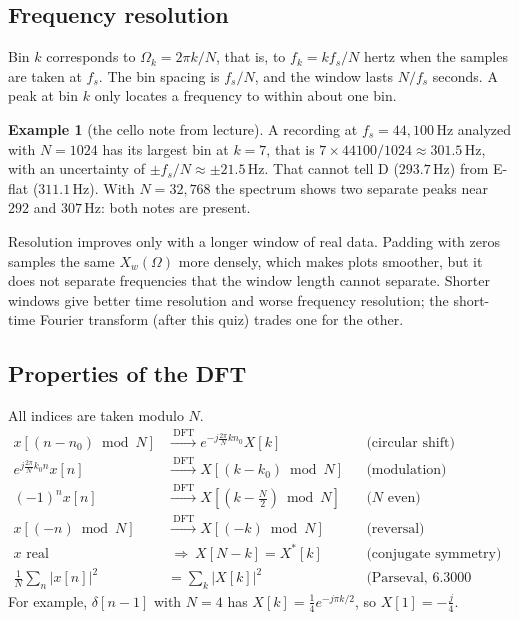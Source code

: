 \documentclass[11pt]{article}
\numberwithin{equation}{section}
\theoremstyle{definition}
\newtheorem{example}{Example}[section]
\theoremstyle{remark}
\newcommand{\dft}{\xrightarrow{\ \text{DFT}\ }}
\begin{document}
\subsection{Frequency resolution}
Bin $k$ corresponds to $\Omega_k=2\pi k/N$, that is, to $f_k=kf_s/N$ hertz when the samples are taken
at $f_s$. The bin spacing is $f_s/N$, and the window lasts $N/f_s$ seconds. A peak at bin $k$ only
locates a frequency to within about one bin.

\begin{example}[the cello note from lecture]
A recording at $f_s=44{,}100$\,Hz analyzed with $N=1024$ has its largest bin at $k=7$, that is
$7\times44100/1024\approx301.5$\,Hz, with an uncertainty of $\pm f_s/N\approx\pm21.5$\,Hz. That cannot
tell D ($293.7$\,Hz) from E-flat ($311.1$\,Hz). With $N=32{,}768$ the spectrum shows two separate peaks
near $292$ and $307$\,Hz: both notes are present.
\end{example}

Resolution improves only with a longer window of real data. Padding with zeros samples the same
$X_w(\Omega)$ more densely, which makes plots smoother, but it does not separate frequencies that
the window length cannot separate. Shorter windows give better time resolution and worse frequency
resolution; the short-time Fourier transform (after this quiz) trades one for the other.

\subsection{Properties of the DFT}
All indices are taken modulo $N$.
\begin{align}
x[(n-n_0)\bmod N]&\dft e^{-j\frac{2\pi}{N}kn_0}X[k] &&\text{(circular shift)}\\
e^{j\frac{2\pi}{N}k_0n}x[n]&\dft X[(k-k_0)\bmod N] &&\text{(modulation)}\\
(-1)^nx[n]&\dft X[(k-\tfrac N2)\bmod N] &&\text{($N$ even)}\\
x[(-n)\bmod N]&\dft X[(-k)\bmod N] &&\text{(reversal)}\\
x\text{ real}&\ \Rightarrow\ X[N-k]=X^*[k] &&\text{(conjugate symmetry)}\\
\tfrac1N\textstyle\sum_n|x[n]|^2&=\textstyle\sum_k|X[k]|^2 &&\text{(Parseval, 6.3000 convention)}
\end{align}
For example, $\delta[n-1]$ with $N=4$ has $X[k]=\frac14e^{-j\pi k/2}$, so $X[1]=-\frac j4$.
\end{document}
